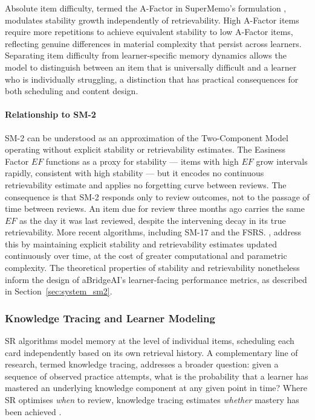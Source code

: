 Absolute item difficulty, termed the A-Factor in SuperMemo's formulation \cite{wozniak1998sm2}, modulates stability growth independently of retrievability. High A-Factor items require more repetitions to achieve equivalent stability to low A-Factor items, reflecting genuine differences in material complexity that persist across learners. Separating item difficulty from learner-specific memory dynamics allows the model to distinguish between an item that is universally difficult and a learner who is individually struggling, a distinction that has practical consequences for both scheduling and content design.

\paragraph{Relationship to SM-2}
SM-2 can be understood as an approximation of the Two-Component Model operating without explicit stability or retrievability estimates. The Easiness Factor $EF$ functions as a proxy for stability — items with high $EF$ grow intervals rapidly, consistent with high stability — but it encodes no continuous retrievability estimate and applies no forgetting curve between reviews. The consequence is that SM-2 responds only to review outcomes, not to the passage of time between reviews. An item due for review three months ago carries the same $EF$ as the day it was last reviewed, despite the intervening decay in its true retrievability. More recent algorithms, including SM-17 and the FSRS.
\cite{ye2023fsrs}, address this by maintaining explicit stability and retrievability estimates updated continuously over time, at the cost of greater computational and parametric complexity. The theoretical properties of stability and retrievability nonetheless inform the design of aBridgeAI's learner-facing performance metrics, as described in Section~\ref{sec:system_sm2}.

\subsubsection{Knowledge Tracing and Learner Modeling}

SR algorithms model memory at the level of individual items, scheduling each card independently based on its own retrieval history. A complementary line of research, termed knowledge tracing, addresses a broader question: given a sequence of observed practice attempts, what is the probability that a learner has mastered an underlying knowledge component at any given point in time? Where SR optimises \textit{when} to review, knowledge tracing estimates \textit{whether} mastery has been achieved \cite{corbett1994}.

